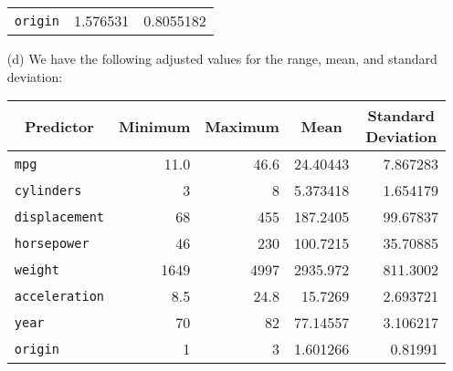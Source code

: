 \begin{itemize}
\begin{center}
\begin{tabular}{ l | r | r }
            \verb|origin| & 1.576531 & 0.8055182
        \end{tabular}
    \end{center}
    \item[(d)] We have the following adjusted values for the range, mean, and 
    standard deviation:
    \begin{center}
        \begin{tabular}{ l | r | r | r | r }
            \multicolumn{1}{c}{Predictor} & \multicolumn{1}{c}{Minimum} 
            & \multicolumn{1}{c}{Maximum} & \multicolumn{1}{c}{Mean} 
            & \multicolumn{1}{c}{Standard Deviation} \\
            \hline
            \verb|mpg| & 11.0 & 46.6 & 24.40443 & 7.867283 \\
            \verb|cylinders| & 3 & 8 & 5.373418 & 1.654179 \\
            \verb|displacement| & 68 & 455 & 187.2405 & 99.67837 \\
            \verb|horsepower| & 46 & 230 & 100.7215 & 35.70885 \\
            \verb|weight| & 1649 & 4997 & 2935.972 & 811.3002 \\
            \verb|acceleration| & 8.5 & 24.8 & 15.7269 & 2.693721 \\
            \verb|year| & 70 & 82 & 77.14557 & 3.106217 \\
            \verb|origin| & 1 & 3 & 1.601266 & 0.81991
        \end{tabular}
    \end{center}
\end{itemize}
